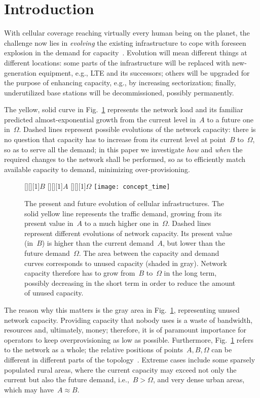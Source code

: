 \documentclass[10pt,journal,cspaper,compsoc]{IEEEtran}
\newcommand{\Fig}[1]{Fig.~\ref{fig:#1}}
\begin{document}
\section{Introduction}
\label{sec:intro}

With cellular coverage reaching virtually every human being on the planet, the challenge now lies in
{\em evolving} the existing infrastructure to cope with foreseen explosion in the 
demand for capacity~\cite{cisco}.
Evolution will mean different things at different locations: some parts of the infrastructure will be replaced 
with new-generation equipment, e.g., LTE and its successors; others will be upgraded for the purpose of enhancing 
capacity, e.g., by increasing sectorization; finally, underutilized base stations will be decommissioned, 
possibly permanently.

The yellow, solid curve in \Fig{concept} represents the network load and its familiar predicted
almost-exponential growth from the current level in~$A$ to a future one in~$\Omega$.
Dashed lines represent possible evolutions of the network capacity:
there is no question that capacity has to increase from its current level at point~$B$ to~$\Omega$,
so as to serve all the demand; in this paper we investigate {\em how} and {\em when} the required changes to the network shall be performed,
so as to efficiently match available capacity to demand, minimizing over-provisioning.

\begin{figure}[t!]
[][][1]{$B$}
[][][1]{$A$}
[][][1]{$\Omega$}
\centering
	\texttt{[image: concept\_time]}
	\caption{The present and future evolution of cellular infrastructures. The solid yellow line represents the traffic demand, growing from its present value in~$A$ to a much higher one in~$\Omega$. Dashed lines represent different evolutions of network capacity.
	Its present value (in~$B$) is higher than the current demand~$A$, but lower than the future demand~$\Omega$.
	The area between the capacity and demand curves corresponds to unused capacity (shaded in gray).
	Network capacity therefore has to grow from~$B$ to~$\Omega$ in the long term, possibly decreasing in the short term in order to reduce the amount of unused capacity.
	}
	\label{fig:concept}
\end{figure}

The reason why this matters is the gray area in \Fig{concept}, representing unused network capacity.
Providing capacity that nobody uses is a waste of bandwidth, resources and, ultimately, money; therefore, it is of paramount importance for operators to keep overprovisioning as low as possible.
Furthermore, \Fig{concept} refers to the network as a whole; the relative positions of points~$A,B,\Omega$
can be different in different parts of the topology~\cite{difrancesco2014}.
Extreme cases include some sparsely populated rural areas, where the current capacity may exceed
not only the current but also the future demand, i.e.,~$B>\Omega$, and very dense urban areas, which may have~$A\approx B$.
\end{document}
